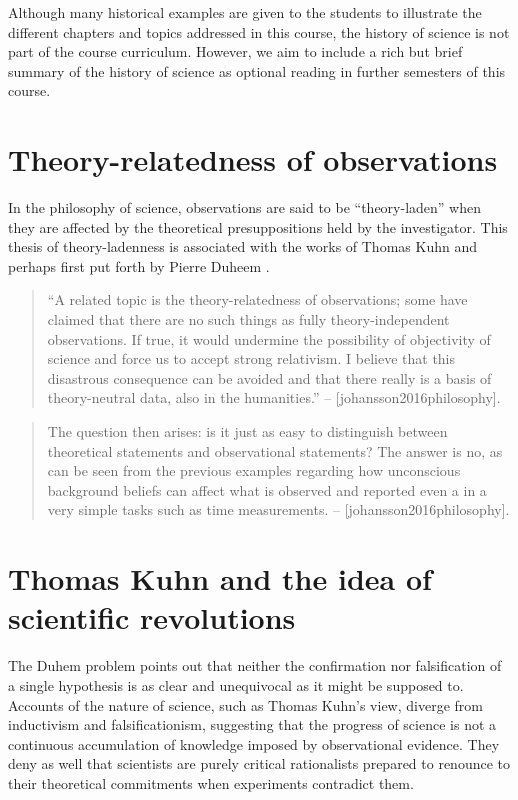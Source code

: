 \documentclass[
]{book}
\begin{document}
Although many historical examples are given to the students to illustrate the different chapters and topics addressed in this course, the history of science is not part of the course curriculum. However, we aim to include a rich but brief summary of the history of science as optional reading in further semesters of this course.

\hypertarget{theory-relatedness-of-observations}{%
\section{Theory-relatedness of observations}\label{theory-relatedness-of-observations}}

In the philosophy of science, observations are said to be ``theory-laden'' when they are affected by the theoretical presuppositions held by the investigator. This thesis of theory-ladenness is associated with the works of Thomas Kuhn and perhaps first put forth by Pierre Duheem \citep{sep-science-theory-observation}.

\begin{quote}
``A related topic is the theory-relatedness of observations; some have claimed that there are no such things as fully theory-independent observations. If true, it would undermine the possibility of objectivity of science and force us to accept strong relativism. I believe that this disastrous consequence can be avoided and that there really is a basis of theory-neutral data, also in the humanities.'' -- {[}johansson2016philosophy{]}.
\end{quote}

\begin{quote}
The question then arises: is it just as easy to distinguish between theoretical statements and observational statements? The answer is no, as can be seen from the previous examples regarding how unconscious background beliefs can affect what is observed and reported even a in a very simple tasks such as time measurements. -- {[}johansson2016philosophy{]}.
\end{quote}

\hypertarget{thomas-kuhn-and-the-idea-of-scientific-revolutions}{%
\section{Thomas Kuhn and the idea of scientific revolutions}\label{thomas-kuhn-and-the-idea-of-scientific-revolutions}}

The Duhem problem points out that neither the confirmation nor falsification of a single hypothesis is as clear and unequivocal as it might be supposed to.
Accounts of the nature of science, such as Thomas Kuhn's view, diverge from inductivism and falsificationism, suggesting that the progress of science is not a continuous accumulation of knowledge imposed by observational evidence. They deny as well that scientists are purely critical rationalists prepared to renounce to their theoretical commitments when experiments contradict them.
\end{document}
